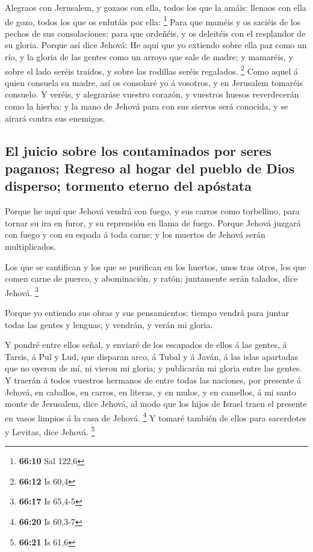  Alegraos con Jerusalem, y gozaos con ella, todos los que
la amáis: llenaos con ella de gozo, todos los que os enlutáis por ella:
\footnote{\textbf{66:10} Sal 122,6}  Para que maméis y os
saciéis de los pechos de sus consolaciones; para que ordeñéis, y os
deleitéis con el resplandor de su gloria.  Porque así dice
Jehová: He aquí que yo extiendo sobre ella paz como un río, y la gloria
de las gentes como un arroyo que sale de madre; y mamaréis, y sobre el
lado seréis traídos, y sobre las rodillas seréis regalados. \footnote{\textbf{66:12}
  Is 60,4}  Como aquel á quien consuela su madre, así os
consolaré yo á vosotros, y en Jerusalem tomaréis consuelo. 
Y veréis, y alegraráse vuestro corazón, y vuestros huesos reverdecerán
como la hierba: y la mano de Jehová para con sus siervos será conocida,
y se airará contra sus enemigos.

\hypertarget{el-juicio-sobre-los-contaminados-por-seres-paganos-regreso-al-hogar-del-pueblo-de-dios-disperso-tormento-eterno-del-apuxf3stata}{%
\subsection{El juicio sobre los contaminados por seres paganos; Regreso
al hogar del pueblo de Dios disperso; tormento eterno del
apóstata}\label{el-juicio-sobre-los-contaminados-por-seres-paganos-regreso-al-hogar-del-pueblo-de-dios-disperso-tormento-eterno-del-apuxf3stata}}

 Porque he aquí que Jehová vendrá con fuego, y sus carros
como torbellino, para tornar su ira en furor, y su reprensión en llama
de fuego.  Porque Jehová juzgará con fuego y con su espada
á toda carne: y los muertos de Jehová serán multiplicados.

 Los que se santifican y los que se purifican en los
huertos, unos tras otros, los que comen carne de puerco, y abominación,
y ratón; juntamente serán talados, dice Jehová. \footnote{\textbf{66:17}
  Is 65,4-5}

 Porque yo entiendo sus obras y sus pensamientos: tiempo
vendrá para juntar todas las gentes y lenguas; y vendrán, y verán mi
gloria.

 Y pondré entre ellos señal, y enviaré de los escapados de
ellos á las gentes, á Tarsis, á Pul y Lud, que disparan arco, á Tubal y
á Javán, á las islas apartadas que no oyeron de mí, ni vieron mi gloria;
y publicarán mi gloria entre las gentes.  Y traerán á todos
vuestros hermanos de entre todas las naciones, por presente á Jehová, en
caballos, en carros, en literas, y en mulos, y en camellos, á mi santo
monte de Jerusalem, dice Jehová, al modo que los hijos de Israel traen
el presente en vasos limpios á la casa de Jehová. \footnote{\textbf{66:20}
  Is 60,3-7}  Y tomaré también de ellos para sacerdotes y
Levitas, dice Jehová. \footnote{\textbf{66:21} Is 61,6}

